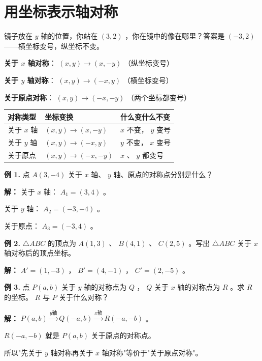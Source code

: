 \section*{用坐标表示轴对称}


\begin{explore}


镜子放在 $y$ 轴的位置，你站在 $(3, 2)$ ，你在镜中的像在哪里？答案是 $(-3, 2)$ ——横坐标变号，纵坐标不变。

\end{explore}

\begin{understand}


\textbf{关于 $x$ 轴对称}： $(x, y) \to (x, -y)$ （纵坐标变号）

\textbf{关于 $y$ 轴对称}： $(x, y) \to (-x, y)$ （横坐标变号）

\textbf{关于原点对称}： $(x, y) \to (-x, -y)$ （两个坐标都变号）

\begin{center}
\begin{tabular}{lll}
\toprule
对称类型 & 坐标变换 & 什么变什么不变 \\
\midrule
关于 $x$ 轴 & $(x, y) \to (x, -y)$ & $x$ 不变， $y$ 变号 \\
关于 $y$ 轴 & $(x, y) \to (-x, y)$ & $y$ 不变， $x$ 变号 \\
关于原点 & $(x, y) \to (-x, -y)$ & $x$ 、 $y$ 都变号 \\
\bottomrule
\end{tabular}
\end{center}


\end{understand}

\begin{workedexamples}


\textbf{例 1.} 点 $A(3, -4)$ 关于 $x$ 轴、 $y$ 轴、原点的对称点分别是什么？

\textbf{解：}
关于 $x$ 轴： $A_1 = (3, 4)$ 。

关于 $y$ 轴： $A_2 = (-3, -4)$ 。

关于原点： $A_3 = (-3, 4)$ 。

\textbf{例 2.} $\triangle ABC$ 的顶点为 $A(1, 3)$ 、 $B(4, 1)$ 、 $C(2, 5)$ 。写出 $\triangle ABC$ 关于 $x$ 轴对称后的顶点坐标。

\textbf{解：}
$A' = (1, -3)$ ， $B' = (4, -1)$ ， $C' = (2, -5)$ 。

\textbf{例 3.} 点 $P(a, b)$ 关于 $y$ 轴的对称点为 $Q$ ， $Q$ 关于 $x$ 轴的对称点为 $R$ 。求 $R$ 的坐标。 $R$ 与 $P$ 关于什么对称？

\textbf{解：}
$P(a, b) \xrightarrow{y\text{轴}} Q(-a, b) \xrightarrow{x\text{轴}} R(-a, -b)$ 。

$R(-a, -b)$ 就是 $P(a, b)$ 关于原点的对称点。

所以"先关于 $y$ 轴对称再关于 $x$ 轴对称"等价于"关于原点对称"。

\end{workedexamples}

